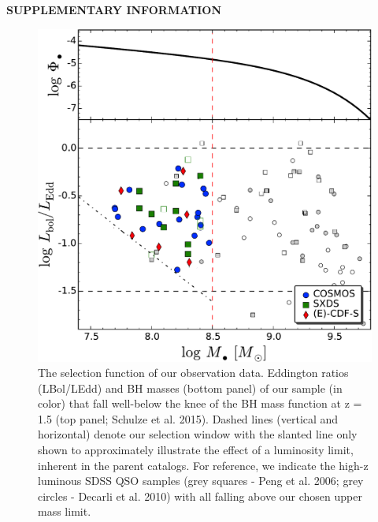 \documentclass{natureprintstyle}
\begin{document}
\clearpage
\newpage

\onecolumn

\begin{center}
{\bf \Large \uppercase{Supplementary information} }
\end{center}

\setcounter{figure}{0}
\vspace{2cm}

\begin{figure}[!h]
\begin{center}
\includegraphics[width=0.8\linewidth]{hst_sample_bhmf.pdf}
\caption{
The selection function of our observation data.
Eddington ratios (LBol/LEdd) and BH masses (bottom panel) of our sample (in color) that fall well-below the knee of the BH mass function at z = 1.5 (top panel; Schulze et al. 2015). Dashed lines (vertical and horizontal) denote our selection window with the slanted line only shown to approximately illustrate the effect of a luminosity limit, inherent in the parent catalogs. For reference, we indicate the high-z luminous SDSS QSO samples (grey squares - Peng et al. 2006; grey circles - Decarli et al. 2010) with all falling above our chosen upper mass limit.
}
\label{fig:support}
\end{center}
\end{figure}
\end{document}
